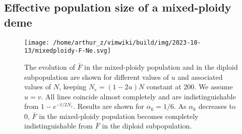 \hypertarget{sec:effsize}{%
\subsection{Effective population size of a mixed-ploidy
deme}\label{sec:effsize}}

\begin{figure}
\hypertarget{fig:fNe}{%
\centering
\texttt{[image: /home/arthur\_z/vimwiki/build/img/2023-10-13/mixedploidy-F-Ne.svg]}
\caption{The evolution of \(\bar{F}\) in the mixed-ploidy population and
in the diploid subpopulation are shown for different values of \(u\) and
associated values of \(N\), keeping \(N_e = (1-2u)N\) constant at 200.
We assume \(u=v\). All lines coincide almost completely and are
indistinguishable from \(1-e^{-t/2N_e}\). Results are shown for
\(\alpha_k=1/6\). As \(\alpha_k\) decreases to 0, \(\bar{F}\) in the
mixed-ploidy population becomes completely indistinguishable from
\(\bar{F}\) in the diploid subpopulation.}\label{fig:fNe}
}
\end{figure}

